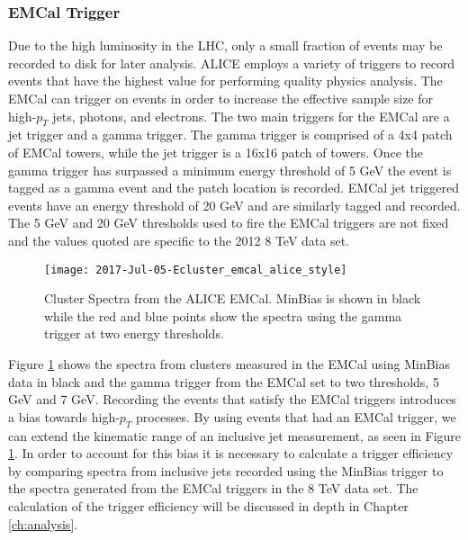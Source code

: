 \subsubsection{EMCal Trigger}


Due to the high luminosity in the LHC, only a small fraction of events may be recorded to disk for later analysis.  ALICE employs a variety of triggers to record events that have the highest value for performing quality physics analysis.  The EMCal can trigger on events in order to increase the effective sample size for high-$p_{T}$ jets, photons, and electrons.  The two main triggers\cite{bourrion2010level}\cite{bourrion2013alice} for the EMCal are a jet trigger and a gamma trigger.  The gamma trigger is comprised of a 4x4 patch of EMCal towers, while the jet trigger is a 16x16 patch of towers.  Once the gamma trigger has surpassed a minimum energy threshold of 5 GeV\cite{Kral2012261} the event is tagged as a gamma event and the patch location is recorded.  EMCal jet triggered events have an energy threshold of 20 GeV and are similarly tagged and recorded.  The 5 GeV and 20 GeV thresholds used to fire the EMCal triggers are not fixed and the values quoted are specific to the 2012 8 TeV data set. 

\begin{figure}[h]
\texttt{[image: 2017-Jul-05-Ecluster\_emcal\_alice\_style]}
\centering
\caption{Cluster Spectra from the ALICE EMCal.  MinBias is shown in black while the red and blue points show the spectra using the gamma trigger at two energy thresholds\cite{Jahnke:2018mrq}.}
\label{fig:EMCalSpectra}
\end{figure}

Figure \ref{fig:EMCalSpectra} shows the spectra from clusters measured in the EMCal using MinBias data in black and the gamma trigger from the EMCal set to two thresholds, 5 GeV and 7 GeV.  Recording the events that satisfy the EMCal triggers introduces a bias towards high-$p_{T}$ processes.  By using events that had an EMCal trigger, we can extend the kinematic range of an inclusive jet measurement, as seen in Figure \ref{fig:EMCalSpectra}.  In order to account for this bias it is necessary to calculate a trigger efficiency by comparing spectra from inclusive jets recorded using the MinBias trigger to the spectra generated from the EMCal triggers in the 8 TeV data set.  The calculation of the trigger efficiency will be discussed in depth in Chapter \ref{ch:analysis}.